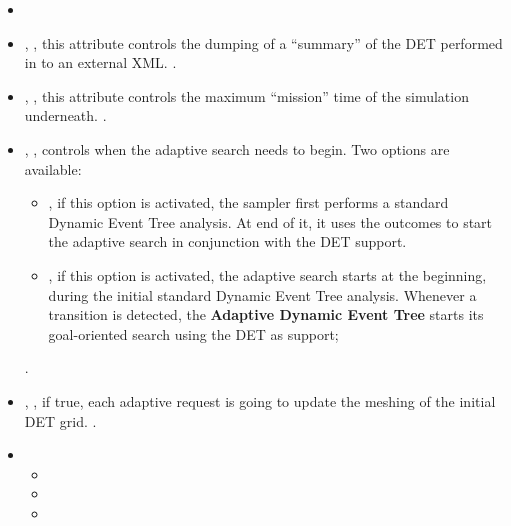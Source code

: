 %
\attrIntro

\begin{itemize}
  \itemsep0em
  \item \nameDescription
  \item {}, ,
    this attribute controls the dumping of a ``summary'' of the DET performed in
    to an external XML.
    .
  \item {}, , this
    attribute controls the maximum ``mission'' time of the simulation
    underneath.
    .
  \item {}, , controls when the
    adaptive search needs to begin.
    Two options are available:
    \begin{itemize}
       \item {}, if this option is activated, the sampler first
         performs a standard Dynamic Event Tree analysis. At end of it, it uses
         the outcomes to start the adaptive search in conjunction with the DET
         support.
       \item {}, if this option is activated, the adaptive
         search starts at the beginning, during the initial standard Dynamic
         Event Tree analysis.
         Whenever a transition is detected, the
         \textbf{Adaptive Dynamic Event Tree} starts its goal-oriented search
         using the DET as support;
    \end{itemize}
      .
  \item {}, , if true,
    each adaptive request is going to update the meshing of the initial DET
    grid.
    .
\end{itemize}

\begin{itemize}
\item \variableDescription
  \variableChildrenIntro
 \begin{itemize}
    \item \distributionDescription
    \item \functionDescription
    \item \gridDescription
  \end{itemize}
\end{itemize}

